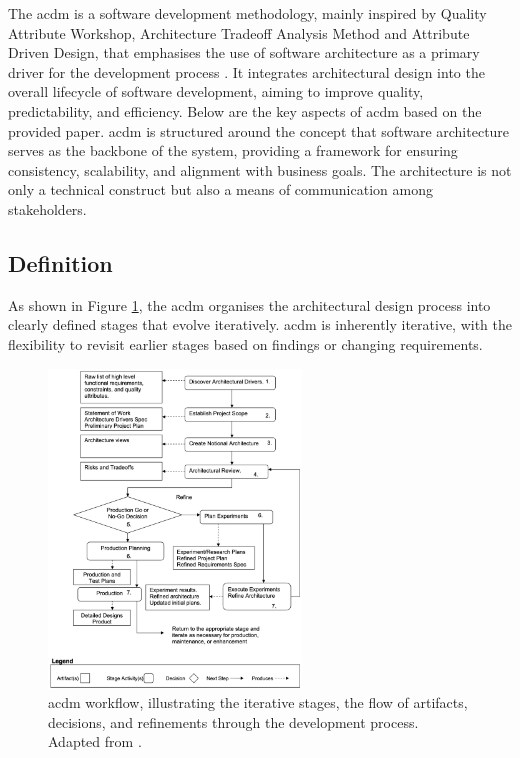 The \ac{acdm} is a software development methodology, mainly inspired by Quality Attribute Workshop, Architecture Tradeoff Analysis Method and Attribute Driven Design, that emphasises the use of software architecture as a primary driver for the development process \cite{Lattanze2005}. It integrates architectural design into the overall lifecycle of software development, aiming to improve quality, predictability, and efficiency. Below are the key aspects of \ac{acdm} based on the provided paper. \ac{acdm} is structured around the concept that software architecture serves as the backbone of the system, providing a framework for ensuring consistency, scalability, and alignment with business goals. The architecture is not only a technical construct but also a means of communication among stakeholders.


\subsection{Definition}

As shown in Figure \ref{fig:acdm_workflow}, the \ac{acdm} organises the architectural design process into clearly defined stages that evolve iteratively. \ac{acdm} is inherently iterative, with the flexibility to revisit earlier stages based on findings or changing requirements.

\begin{figure}[!htb]
    \includegraphics[width=0.6\textwidth]{figs/chapter3/acdm_workflow.png}
    \centering
    \caption[\acl{acdm} Workflow]{\ac{acdm} workflow, illustrating the iterative stages, the flow of artifacts, decisions, and refinements through the development process. Adapted from .}
    \label{fig:acdm_workflow}
\end{figure}


